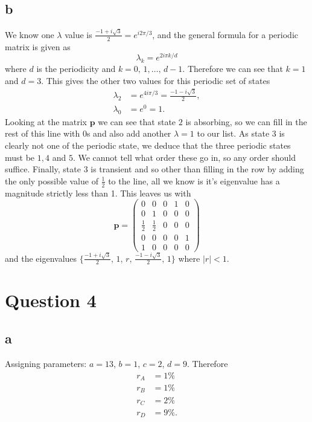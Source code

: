\documentclass{article}
\begin{document}
\subsection{b}
We know one $\lambda$ value is $\frac{-1+i\sqrt{3}}{2} = e^{i2\pi/3}$, and the general formula for a periodic matrix is given as
\begin{equation}
    \lambda_k = e^{2i\pi k/d}
\end{equation}
where $d$ is the periodicity and $k=0,\,1,\ldots,\,d-1$. Therefore we can see that $k=1$ and $d=3$. This gives the other two values for this periodic set of states
\begin{align}
    \lambda_2 &= e^{4i\pi/3} = \frac{-1-i\sqrt{3}}{2},\\
    \lambda_0 &= e^0 = 1.
\end{align}
Looking at the matrix $\mathbf{p}$ we can see that state $2$ is absorbing, so we can fill in the rest of this line with $0$s and also add another $\lambda=1$ to our list. As state $3$ is clearly not one of the periodic state, we deduce that the three periodic states must be $1,4$ and $5$. We cannot tell what order these go in, so any order should suffice. Finally, state $3$ is transient and so other than filling in the row by adding the only possible value of $\frac{1}{2}$ to the line, all we know is it's eigenvalue has a magnitude strictly less than 1.
This leaves us with
\begin{equation}
    \mathbf{p}=\begin{pmatrix}
        0 & 0 & 0 & 1 & 0 \\
        0 & 1 & 0 & 0 & 0 \\
        \frac{1}{2} & \frac{1}{2} & 0 & 0 & 0 \\
        0 & 0 & 0 & 0 & 1 \\
        1 & 0 & 0 & 0 & 0
    \end{pmatrix}
\end{equation}
and the eigenvalues $\{\frac{-1+i\sqrt{3}}{2},\,1,\,r,\,\frac{-1-i\sqrt{3}}{2},\,1 \}$ where $\vert r\vert<1$.

\pagebreak
\section{Question 4}
\subsection{a}
Assigning parameters: $a = 13$, $b=1$, $c=2$, $d=9$. Therefore
\begin{align}
    r_A &= 1\% \\
    r_B &= 1\% \\
    r_C &= 2\% \\
    r_D &= 9\%. 
\end{align}
\end{document}
